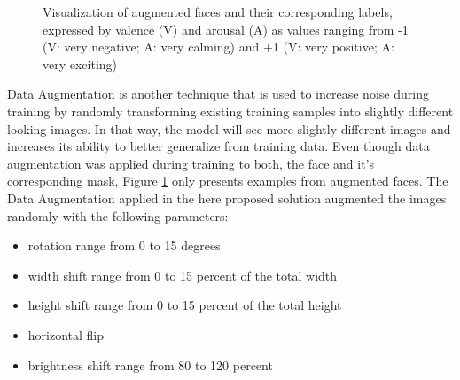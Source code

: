\begin{figure}[H]
  \hfill
  \hfill
  \caption[Data Augmentation]{Visualization of augmented faces and their corresponding labels, expressed by valence (V) and arousal (A) as values ranging from -1 (V: very negative; A: very calming) and +1 (V: very positive; A: very exciting)}
  \label{fig:MethodologyDataAugmentation}
\end{figure}

Data Augmentation is another technique that is used to increase noise during training by randomly transforming existing training samples into slightly different looking images. In that way, the model will see more slightly different images and increases its ability to better generalize from training data. Even though data augmentation was applied during training to both, the face and it's corresponding mask, Figure \ref{fig:MethodologyDataAugmentation} only presents examples from augmented faces.
\newline\newline
The Data Augmentation applied in the here proposed solution augmented the images randomly with the following parameters:

\begin{itemize}
    \item rotation range from 0 to 15 degrees
    \item width shift range from 0 to 15 percent of the total width
    \item height shift range from 0 to 15 percent of the total height
    \item horizontal flip
    \item brightness shift range from 80 to 120 percent
\end{itemize}


